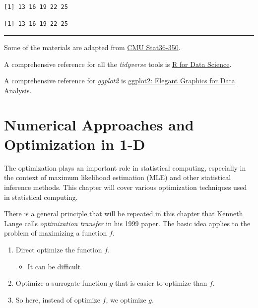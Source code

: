 \documentclass[
  letterpaper,
  DIV=11,
  numbers=noendperiod]{scrreprt}
\newenvironment{Shaded}{\begin{snugshade}}{\end{snugshade}}
\newcommand{\CommentTok}[1]{\textcolor[rgb]{0.37,0.37,0.37}{#1}}
\newcommand{\FunctionTok}[1]{\textcolor[rgb]{0.28,0.35,0.67}{#1}}
\newcommand{\NormalTok}[1]{\textcolor[rgb]{0.00,0.23,0.31}{#1}}
\newcommand{\SpecialCharTok}[1]{\textcolor[rgb]{0.37,0.37,0.37}{#1}}
\providecommand{\tightlist}{%
  \setlength{\itemsep}{0pt}\setlength{\parskip}{0pt}}
\begin{document}
\begin{verbatim}
[1] 13 16 19 22 25
\end{verbatim}

\begin{Shaded}
\end{Shaded}

\begin{verbatim}
[1] 13 16 19 22 25
\end{verbatim}

\begin{center}\rule{0.5\linewidth}{0.5pt}\end{center}

Some of the materials are adapted from
\href{https://www.stat.cmu.edu/~ryantibs/statcomp/}{CMU Stat36-350}.

A comprehensive reference for all the \emph{tidyverse} tools is
\href{https://r4ds.had.co.nz/}{R for Data Science}.

A comprehensive reference for \emph{ggplot2} is
\href{https://ggplot2-book.org/}{ggplot2: Elegant Graphics for Data
Analysis}.


\chapter{Numerical Approaches and Optimization in
1-D}\label{numerical-approaches-and-optimization-in-1-d}

The optimization plays an important role in statistical computing,
especially in the context of maximum likelihood estimation (MLE) and
other statistical inference methods. This chapter will cover various
optimization techniques used in statistical computing.

There is a general principle that will be repeated in this chapter that
Kenneth Lange calls \emph{optimization transfer} in his 1999 paper. The
basic idea applies to the problem of maximizing a function \(f\).

\begin{enumerate}
\def\labelenumi{\arabic{enumi}.}
\tightlist
\item
  Direct optimize the function \(f\).

  \begin{itemize}
  \tightlist
  \item
    It can be difficult
  \end{itemize}
\item
  Optimize a surrogate function \(g\) that is easier to optimize than
  \(f\).
\item
  So here, instead of optimize \(f\), we optimize \(g\).
\end{enumerate}
\end{document}
